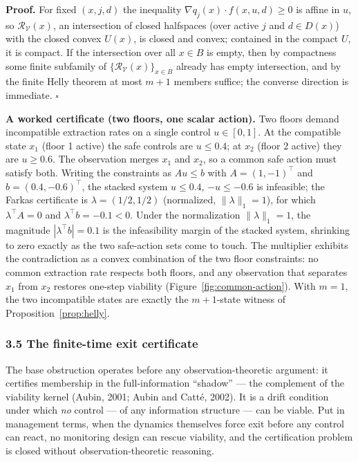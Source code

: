 \documentclass[10pt,twocolumn]{article}
\theoremstyle{definition}
\begin{document}
\textbf{Proof.} For fixed \((x,j,d)\) the inequality
\(\nabla q_j(x)\cdot f(x,u,d)\ge 0\) is affine in \(u\), so
\(\mathcal R_{\mathcal V}(x)\), an intersection of closed halfspaces
(over active \(j\) and \(d\in D(x)\)) with the closed convex \(U(x)\),
is closed and convex; contained in the compact \(U\), it is compact. If
the intersection over all \(x\in B\) is empty, then by compactness some
finite subfamily of \(\{\mathcal R_{\mathcal V}(x)\}_{x\in B}\) already
has empty intersection, and by the finite Helly theorem at most \(m+1\)
members suffice; the converse direction is immediate. \hfill\(\square\)

\textbf{A worked certificate (two floors, one scalar action).} Two
floors demand incompatible extraction rates on a single control
\(u\in[0,1]\). At the compatible state \(x_1\) (floor 1 active) the safe
controls are \(u\le 0.4\); at \(x_2\) (floor 2 active) they are
\(u\ge 0.6\). The observation merges \(x_1\) and \(x_2\), so a common
safe action must satisfy both. Writing the constraints as \(Au\le b\)
with \(A=(1,-1)^{\top}\) and \(b=(0.4,-0.6)^{\top}\), the stacked system
\(u\le 0.4\), \(-u\le -0.6\) is infeasible; the Farkas certificate is
\(\lambda=(1/2,1/2)\) (normalized, \(\|\lambda\|_1=1\)), for which
\(\lambda^{\top}A=0\) and \(\lambda^{\top}b=-0.1<0\). Under the normalization
\(\|\lambda\|_1=1\), the magnitude \(|\lambda^{\top}b|=0.1\) is the
infeasibility margin of the stacked system, shrinking to zero exactly as
the two safe-action sets come to touch. The multiplier
exhibits the contradiction as a convex combination of the two floor
constraints: no common extraction rate respects both floors, and any
observation that separates \(x_1\) from \(x_2\) restores one-step
viability (Figure~\ref{fig:common-action}). With \(m=1\), the two
incompatible states are exactly the \(m+1\)-state witness of
Proposition~\ref{prop:helly}.

\subsubsection{3.5 The finite-time exit
certificate}\label{the-finite-time-exit-certificate}

The base obstruction operates before any observation-theoretic argument: it
certifies membership in the full-information ``shadow'' --- the
complement of the viability kernel (Aubin, 2001; Aubin and
Catt\'e, 2002).
It is a drift condition under which \emph{no} control --- of any
information structure --- can be viable. Put in management terms, when the dynamics themselves force exit before any control can react, no monitoring design can rescue viability, and the certification problem is closed without observation-theoretic reasoning.
\end{document}
